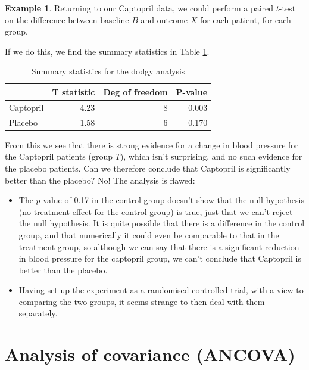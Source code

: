 \documentclass[
  openany]{book}
\providecommand{\tightlist}{%
  \setlength{\itemsep}{0pt}\setlength{\parskip}{0pt}}
\theoremstyle{definition}
\theoremstyle{definition}
\newtheorem{example}{Example}[chapter]
\theoremstyle{definition}
\theoremstyle{definition}
\theoremstyle{remark}
\begin{document}
\begin{example}

Returning to our Captopril data, we could perform a paired \(t\)-test on the difference between baseline \(B\) and outcome \(X\) for each patient, for each group.

If we do this, we find the summary statistics in Table \ref{tab:ttestdodge}.

\begin{table}

\caption{\label{tab:ttestdodge}Summary statistics for the dodgy analysis}
\centering
\begin{tabular}[t]{l|r|r|r}
\hline
  & T statistic & Deg of freedom & P-value\\
\hline
Captopril & 4.23 & 8 & 0.003\\
\hline
Placebo & 1.58 & 6 & 0.170\\
\hline
\end{tabular}
\end{table}

From this we see that there is strong evidence for a change in blood pressure for the Captopril patients (group \(T\)), which isn't surprising, and no such evidence for the placebo patients. Can we therefore conclude that Captopril is significantly better than the placebo? No! The analysis is flawed:

\begin{itemize}
\tightlist
\item
  The \(p\)-value of 0.17 in the control group doesn't show that the null hypothesis (no treatment effect for the control group) is true, just that we can't reject the null hypothesis. It is quite possible that there is a difference in the control group, and that numerically it could even be comparable to that in the treatment group, so although we can say that there is a significant reduction in blood pressure for the captopril group, we can't conclude that Captopril is better than the placebo.
\item
  Having set up the experiment as a randomised controlled trial, with a view to comparing the two groups, it seems strange to then deal with them separately.
\end{itemize}

\end{example}

\section{Analysis of covariance (ANCOVA)}\label{analysis-of-covariance-ancova}
\end{document}
